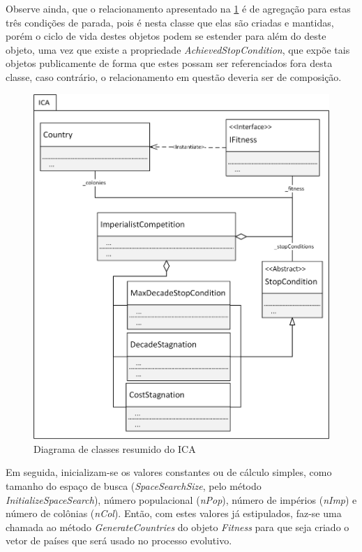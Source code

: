 Observe ainda, que o relacionamento apresentado na \ref{fig:ClassesICA-ICAResumed} é de agregação para estas três condições de parada, pois é nesta classe que elas são criadas e mantidas, porém o ciclo de vida destes objetos podem se estender para além do deste objeto, uma vez que existe a propriedade \emph{AchievedStopCondition}, que expõe tais objetos publicamente de forma que estes possam ser referenciados fora desta classe, caso contrário, o relacionamento em questão deveria ser de composição.

\begin{figure}[h]
	\centering	
	\includegraphics[scale=0.9]{Figuras/ClassesICA-ICAResumed.png}
	\caption{Diagrama de classes resumido do ICA }
	\label{fig:ClassesICA-ICAResumed}
	\end{figure}
    
Em seguida, inicializam-se os valores constantes ou de cálculo simples, como tamanho do espaço de busca (\emph{SpaceSearchSize}, pelo método \emph{InitializeSpaceSearch}), número populacional (\emph{nPop}), número de impérios (\emph{nImp}) e número de colônias (\emph{nCol}). Então, com estes valores já estipulados, faz-se uma chamada ao método \emph{GenerateCountries} do objeto \emph{Fitness} para que seja criado o vetor de países que será usado no processo evolutivo.


